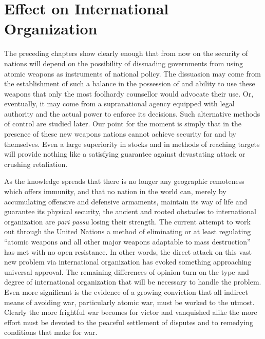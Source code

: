 
\chapter[Effect on International Organization]{Effect on International Organization}

\vspace{-2pt}


\vspace{39pt}

The preceding chapters show clearly enough that from now on the security of nations will depend on the possibility of dissuading governments from using atomic weapons as instruments of national policy. The dissuasion may come from the establishment of such a balance in the possession of and ability to use these weapons that only the most foolhardy counsellor would advocate their use. Or, eventually, it may come from a supranational agency equipped with legal authority and the actual power to enforce its decisions. Such alternative methods of control are studied later. Our point for the moment is simply that in the presence of these new weapons nations cannot achieve security for and by themselves. Even a large superiority in stocks and in methods of reaching targets will provide nothing like a satisfying guarantee against devastating attack or crushing retaliation.

As the knowledge spreads that there is no longer any geographic remoteness which offers immunity, and that no nation in the world can, merely by accumulating offensive and defensive armaments, maintain its way of life and guarantee its physical security, the ancient and rooted obstacles to international organization are \emph{pari passu} losing their strength. The current attempt to work out through the United Nations a method of eliminating or at least regulating ``atomic weapons and all other major weapons adaptable to mass destruction'' has met with no open resistance. In other words, the direct attack on this vast new problem via international organization has evoked something approaching universal approval. The remaining differences of opinion turn on the type and degree of international organization that will be necessary to handle the problem. Even more significant is the evidence of a growing conviction that all indirect means of avoiding war, particularly atomic war, must be worked to the utmost. Clearly the more frightful war becomes for victor and vanquished alike the more effort must be devoted to the peaceful settlement of disputes and to remedying conditions that make for war.


